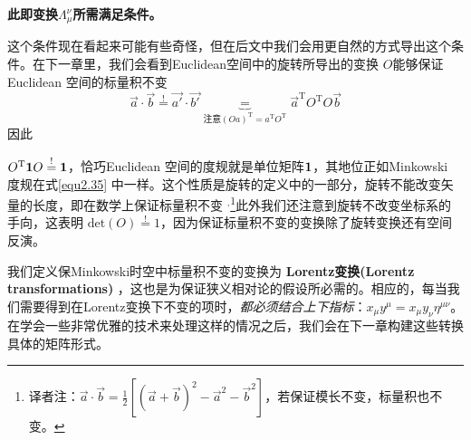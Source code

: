 {\bf{此即变换$\Lambda_\mu^\nu$所需满足条件。}}

这个条件现在看起来可能有些奇怪，但在后文中我们会用更自然的方式导出这个条件。在下一章里，我们会看到Euclidean空间中的旋转所导出的变换%
$O$能够保证Euclidean 空间的标量积不变%
\begin{equation}\label{equ2.36}
  \vec{a} \cdot \vec{b}
  \overset{\text{!}}{=}
  \vec{a'} \cdot \vec{b'}
  \!\!\!\!\!\!\!\!\!\!
  \underbrace{=}_{\text{注意}
  (Oa)^\mathrm{T}=a^\mathrm{T}O^\mathrm{T}}
  \!\!\!\!\!\!\!\!\!\!
  \vec{a}^\mathrm{T} O^\mathrm{T} O\vec{b}
\end{equation}
因此

$O^\mathrm{T} {\bf{1}} O\overset{\text{!}}{=}{\bf{1}}$，恰巧Euclidean 空间的度规就是单位矩阵${\bf{1}}$，其地位正如Minkowski 度规在式\eqref{equ2.35} 中一样。这个性质是旋转的定义中的一部分，旋转不能改变矢量的长度，即在数学上保证标量积不变
$^{,}$\footnote{译者注：$\vec{a}\cdot \vec{b}=\frac{1}{2} [(\vec{a}+\vec{b})^2-\vec{a}^2-\vec{b}^2]$，若保证模长不变，标量积也不变。}此外我们还注意到旋转不改变坐标系的手向，这表明 $\text{det}(O) \overset{\text{!}}{=}1$，因为保证标量积不变的变换除了旋转变换还有空间反演。

我们定义保Minkowski时空中标量积不变的变换为
{\bf{Lorentz变换(Lorentz transformations)}}
，这也是为保证狭义相对论的假设所必需的。相应的，每当我们需要得到在Lorentz变换下不变的项时，{\it{都必须结合上下指标}}：$x_\mu y^\mu=x_\mu y_\nu \eta^{\mu\nu}$。
在学会一些非常优雅的技术来处理这样的情况之后，我们会在下一章构建这些转换具体的矩阵形式。
